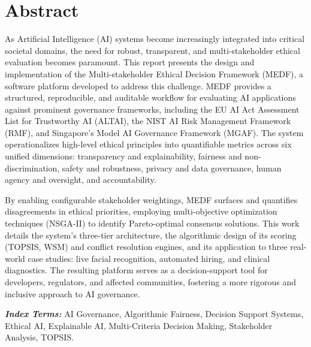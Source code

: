 \chapter*{Abstract}

As Artificial Intelligence (AI) systems become increasingly integrated into critical societal domains, the need for robust, transparent, and multi-stakeholder ethical evaluation becomes paramount. This report presents the design and implementation of the Multi-stakeholder Ethical Decision Framework (MEDF), a software platform developed to address this challenge. MEDF provides a structured, reproducible, and auditable workflow for evaluating AI applications against prominent governance frameworks, including the EU AI Act Assessment List for Trustworthy AI (ALTAI), the NIST AI Risk Management Framework (RMF), and Singapore's Model AI Governance Framework (MGAF). The system operationalizes high-level ethical principles into quantifiable metrics across six unified dimensions: transparency and explainability, fairness and non-discrimination, safety and robustness, privacy and data governance, human agency and oversight, and accountability.

By enabling configurable stakeholder weightings, MEDF surfaces and quantifies disagreements in ethical priorities, employing multi-objective optimization techniques (NSGA-II) to identify Pareto-optimal consensus solutions. This work details the system's three-tier architecture, the algorithmic design of its scoring (TOPSIS, WSM) and conflict resolution engines, and its application to three real-world case studies: live facial recognition, automated hiring, and clinical diagnostics. The resulting platform serves as a decision-support tool for developers, regulators, and affected communities, fostering a more rigorous and inclusive approach to AI governance.

\textbf{\textit{Index Terms:}} AI Governance, Algorithmic Fairness, Decision Support Systems, Ethical AI, Explainable AI, Multi-Criteria Decision Making, Stakeholder Analysis, TOPSIS.
